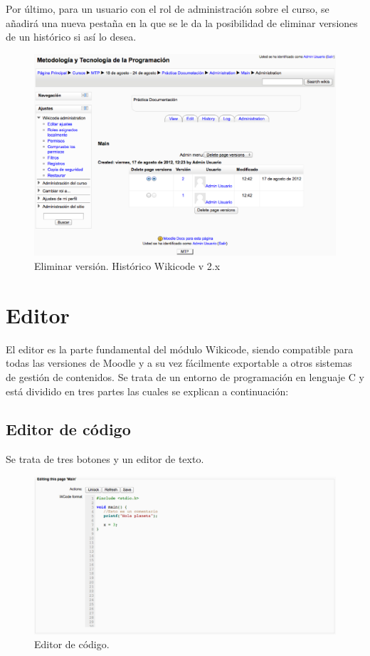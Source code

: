 \newpage

Por último, para un usuario con el rol de administración sobre el curso, se añadirá una nueva pestaña en la que se le da la posibilidad de eliminar versiones de un histórico si así lo desea.

\vspace{1cm}

\begin{figure}[h]
	\label{v2admin.eps}
	\includegraphics[width=\textwidth]{./img/v2admin.eps}
	\caption{Eliminar versión. Histórico Wikicode v 2.x}
\end{figure}

\newpage

\section{Editor}
\label{editSection}

El editor es la parte fundamental del módulo Wikicode, siendo compatible para todas las versiones de Moodle y a su vez fácilmente exportable a otros sistemas de gestión de contenidos. Se trata de un entorno de programación en lenguaje C y está dividido en tres partes las cuales se explican a continuación:

\subsection{Editor de código}

Se trata de tres botones y un editor de texto.

\begin{figure}[h]
	\label{eedit1.eps}
	\includegraphics[width=\textwidth]{./img/eedit1.eps}
	\caption{Editor de código.}
\end{figure}

